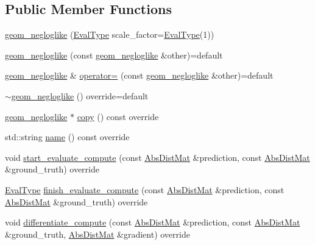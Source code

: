 \subsection*{Public Member Functions}
\begin{DoxyCompactItemize}
\item 
\hyperlink{classlbann_1_1geom__negloglike_a2cd89175b2c6ec556b9697aa75d6068e}{geom\+\_\+negloglike} (\hyperlink{base_8hpp_a3266f5ac18504bbadea983c109566867}{Eval\+Type} scale\+\_\+factor=\hyperlink{base_8hpp_a3266f5ac18504bbadea983c109566867}{Eval\+Type}(1))
\item 
\hyperlink{classlbann_1_1geom__negloglike_ada3ee13998f96d7cbf16f8605194b96f}{geom\+\_\+negloglike} (const \hyperlink{classlbann_1_1geom__negloglike}{geom\+\_\+negloglike} \&other)=default
\item 
\hyperlink{classlbann_1_1geom__negloglike}{geom\+\_\+negloglike} \& \hyperlink{classlbann_1_1geom__negloglike_afc2a0cfef07468bd9ed628b734fbc5da}{operator=} (const \hyperlink{classlbann_1_1geom__negloglike}{geom\+\_\+negloglike} \&other)=default
\item 
\hyperlink{classlbann_1_1geom__negloglike_a15078d619f246c8bc891212d6ff276db}{$\sim$geom\+\_\+negloglike} () override=default
\item 
\hyperlink{classlbann_1_1geom__negloglike}{geom\+\_\+negloglike} $\ast$ \hyperlink{classlbann_1_1geom__negloglike_aa9be2be40a9bbc9599c2e2de3c01872e}{copy} () const override
\item 
std\+::string \hyperlink{classlbann_1_1geom__negloglike_aabbb379989dba5bc7cb698ebf7bc8861}{name} () const override
\item 
void \hyperlink{classlbann_1_1geom__negloglike_ae17106630ad2f85df0dbd528bfbbea7d}{start\+\_\+evaluate\+\_\+compute} (const \hyperlink{base_8hpp_a9a697a504ae84010e7439ffec862b470}{Abs\+Dist\+Mat} \&prediction, const \hyperlink{base_8hpp_a9a697a504ae84010e7439ffec862b470}{Abs\+Dist\+Mat} \&ground\+\_\+truth) override
\item 
\hyperlink{base_8hpp_a3266f5ac18504bbadea983c109566867}{Eval\+Type} \hyperlink{classlbann_1_1geom__negloglike_a320ac2f029e0a43640878bc052bf5299}{finish\+\_\+evaluate\+\_\+compute} (const \hyperlink{base_8hpp_a9a697a504ae84010e7439ffec862b470}{Abs\+Dist\+Mat} \&prediction, const \hyperlink{base_8hpp_a9a697a504ae84010e7439ffec862b470}{Abs\+Dist\+Mat} \&ground\+\_\+truth) override
\item 
void \hyperlink{classlbann_1_1geom__negloglike_ac87d97a78cc3bb00f976bcd604fc72d7}{differentiate\+\_\+compute} (const \hyperlink{base_8hpp_a9a697a504ae84010e7439ffec862b470}{Abs\+Dist\+Mat} \&prediction, const \hyperlink{base_8hpp_a9a697a504ae84010e7439ffec862b470}{Abs\+Dist\+Mat} \&ground\+\_\+truth, \hyperlink{base_8hpp_a9a697a504ae84010e7439ffec862b470}{Abs\+Dist\+Mat} \&gradient) override
\end{DoxyCompactItemize}
